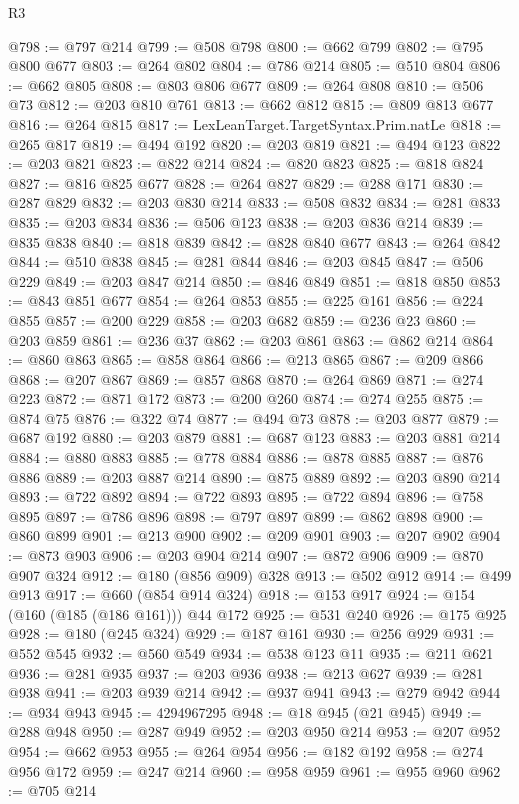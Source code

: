 \begin{lexlean}{R3}
\begin{coremodule}
@798 := @797 @214
@799 := @508 @798
@800 := @662 @799
@802 := @795 @800 @677
@803 := @264 @802
@804 := @786 @214
@805 := @510 @804
@806 := @662 @805
@808 := @803 @806 @677
@809 := @264 @808
@810 := @506 @73
@812 := @203 @810 @761
@813 := @662 @812
@815 := @809 @813 @677
@816 := @264 @815
@817 := LexLeanTarget.TargetSyntax.Prim.natLe
@818 := @265 @817
@819 := @494 @192
@820 := @203 @819
@821 := @494 @123
@822 := @203 @821
@823 := @822 @214
@824 := @820 @823
@825 := @818 @824
@827 := @816 @825 @677
@828 := @264 @827
@829 := @288 @171
@830 := @287 @829
@832 := @203 @830 @214
@833 := @508 @832
@834 := @281 @833
@835 := @203 @834
@836 := @506 @123
@838 := @203 @836 @214
@839 := @835 @838
@840 := @818 @839
@842 := @828 @840 @677
@843 := @264 @842
@844 := @510 @838
@845 := @281 @844
@846 := @203 @845
@847 := @506 @229
@849 := @203 @847 @214
@850 := @846 @849
@851 := @818 @850
@853 := @843 @851 @677
@854 := @264 @853
@855 := @225 @161
@856 := @224 @855
@857 := @200 @229
@858 := @203 @682
@859 := @236 @23
@860 := @203 @859
@861 := @236 @37
@862 := @203 @861
@863 := @862 @214
@864 := @860 @863
@865 := @858 @864
@866 := @213 @865
@867 := @209 @866
@868 := @207 @867
@869 := @857 @868
@870 := @264 @869
@871 := @274 @223
@872 := @871 @172
@873 := @200 @260
@874 := @274 @255
@875 := @874 @75
@876 := @322 @74
@877 := @494 @73
@878 := @203 @877
@879 := @687 @192
@880 := @203 @879
@881 := @687 @123
@883 := @203 @881 @214
@884 := @880 @883
@885 := @778 @884
@886 := @878 @885
@887 := @876 @886
@889 := @203 @887 @214
@890 := @875 @889
@892 := @203 @890 @214
@893 := @722 @892
@894 := @722 @893
@895 := @722 @894
@896 := @758 @895
@897 := @786 @896
@898 := @797 @897
@899 := @862 @898
@900 := @860 @899
@901 := @213 @900
@902 := @209 @901
@903 := @207 @902
@904 := @873 @903
@906 := @203 @904 @214
@907 := @872 @906
@909 := @870 @907 @324
@912 := @180 (@856 @909) @328
@913 := @502 @912
@914 := @499 @913
@917 := @660 (@854 @914 @324)
@918 := @153 @917
@924 := @154 (@160 (@185 (@186 @161))) @44 @172
@925 := @531 @240
@926 := @175 @925
@928 := @180 (@245 @324)
@929 := @187 @161
@930 := @256 @929
@931 := @552 @545
@932 := @560 @549
@934 := @538 @123 @11
@935 := @211 @621
@936 := @281 @935
@937 := @203 @936
@938 := @213 @627
@939 := @281 @938
@941 := @203 @939 @214
@942 := @937 @941
@943 := @279 @942
@944 := @934 @943
@945 := 4294967295
@948 := @18 @945 (@21 @945)
@949 := @288 @948
@950 := @287 @949
@952 := @203 @950 @214
@953 := @207 @952
@954 := @662 @953
@955 := @264 @954
@956 := @182 @192
@958 := @274 @956 @172
@959 := @247 @214
@960 := @958 @959
@961 := @955 @960
@962 := @705 @214

\end{coremodule}
\end{lexlean}

